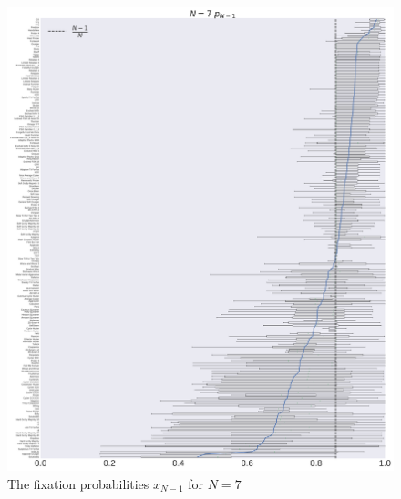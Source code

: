 \documentclass[10pt,letterpaper]{article}
\begin{document}
\begin{figure}[!hbtp]
    \centering
    \includegraphics[width=\textwidth]{./boxplot_7_resist.pdf}
    \caption{The fixation probabilities \(x_{N-1}\) for \(N=7\)}
\end{figure}
\end{document}
